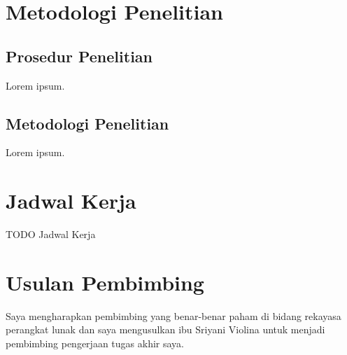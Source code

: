 \documentclass[a4paper, 12pt]{report}
\begin{document}
\section*{Metodologi Penelitian}

\subsection*{Prosedur Penelitian}
\begin{flushleft}
Lorem ipsum.
\end{flushleft}

\subsection*{Metodologi Penelitian}
\begin{flushleft}
Lorem ipsum.
\end{flushleft}

\section*{Jadwal Kerja}
\begin{flushleft}
TODO Jadwal Kerja
\end{flushleft}

\section*{Usulan Pembimbing}
Saya mengharapkan pembimbing yang benar-benar paham di bidang rekayasa perangkat lunak dan saya mengusulkan ibu Sriyani Violina untuk menjadi pembimbing pengerjaan tugas akhir saya.
\end{document}
